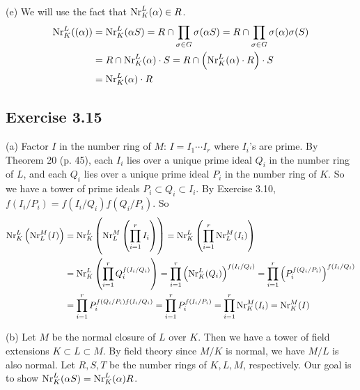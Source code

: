 \documentclass[../Marcus.tex]{subfiles}
\begin{document}
(e) We will use the fact that $\operatorname{Nr}^L_K(\alpha)\in R$.
\begin{align*}
    \operatorname{Nr}^L_K((\alpha)) &= \operatorname{Nr}^L_K(\alpha S) = R\cap \prod_{\sigma\in G}\sigma(\alpha S) = R\cap \prod_{\sigma\in G}\sigma(\alpha)\sigma(S) \\
    &= R\cap \operatorname{Nr}^L_K(\alpha)\cdot S = R\cap\left(\operatorname{Nr}^L_K(\alpha)\cdot R\right)\cdot S \\
    &= \operatorname{Nr}^L_K(\alpha)\cdot R
\end{align*}

\subsection*{Exercise 3.15}

(a) Factor $I$ in the number ring of $M$: $I=I_1\cdots I_r$ where $I_i$'s are prime. By Theorem 20 (p. 45), each $I_i$ lies over a unique prime ideal $Q_i$ in the number ring of $L$, and each $Q_i$ lies over a unique prime ideal $P_i$ in the number ring of $K$. So we have a tower of prime ideals $P_i\subset Q_i\subset I_i$. By Exercise 3.10, $f(I_i/P_i)=f(I_i/Q_i)f(Q_i/P_i)$. So
\begin{align*}
    \operatorname{Nr}^L_K\left(\operatorname{Nr}^M_L(I)\right) &= \operatorname{Nr}^L_K\left(\operatorname{Nr}^M_L\left(\prod_{i=1}^r I_i\right)\right) = \operatorname{Nr}^L_K\left(\prod_{i=1}^r \operatorname{Nr}^M_L(I_i)\right) \\ 
    &= \operatorname{Nr}^L_K\left(\prod_{i=1}^r Q_i^{f(I_i/Q_i)}\right) = \prod_{i=1}^r \left(\operatorname{Nr}^L_K(Q_i)\right)^{f(I_i/Q_i)} = \prod_{i=1}^r \left(P_i^{f(Q_i/P_i)}\right)^{f(I_i/Q_i)} \\
    &= \prod_{i=1}^r P_i^{f(Q_i/P_i)f(I_i/Q_i)} = \prod_{i=1}^r P_i^{f(I_i/P_i)} = \prod_{i=1}^r \operatorname{Nr}^M_K(I_i) = \operatorname{Nr}^M_K(I)
\end{align*}

(b) Let $M$ be the normal closure of $L$ over $K$. Then we have a tower of field extensions $K\subset L\subset M$. By field theory since $M/K$ is normal, we have $M/L$ is also normal. Let $R,S,T$ be the number rings of $K,L,M$, respectively. Our goal is to show $\operatorname{Nr}^L_K(\alpha S)=\operatorname{Nr}^L_K(\alpha)R$.
\end{document}
